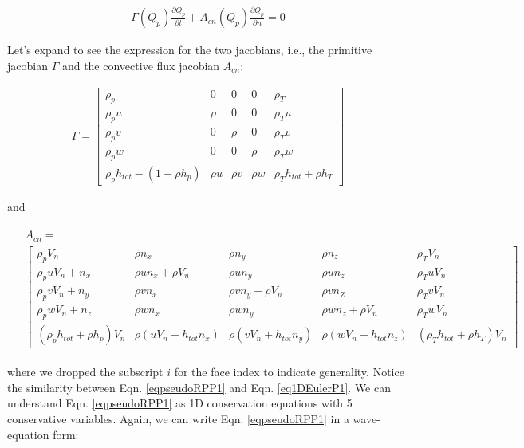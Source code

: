 \documentclass[12pt, letterpaper]{report}
\begin{document}
\begin{align}\label{eqpseudoRPP1}
   \Gamma(Q_p) \frac{\partial Q_p}{\partial t} + A_{cn}(Q_p)\frac{\partial Q_p}{\partial n} = 0
\end{align}

Let's expand to see the expression for the two jacobians, i.e., the primitive jacobian $\Gamma$ and
the convective flux jacobian $A_{cn}$:

\begin{align}\label{eqGamma3D}
   \Gamma = 
   \begin{bmatrix}
      \rho_p & 0 & 0 & 0 & \rho_T \\
      \rho_p u & \rho & 0 & 0 & \rho_T u \\ 
      \rho_p v & 0 & \rho & 0 & \rho_T v \\
      \rho_p w & 0 & 0 & \rho & \rho_T w \\
      \rho_p h_{tot} - (1 - \rho h_p) & \rho u & \rho v & \rho w & \rho_T h_{tot} + \rho h_T
   \end{bmatrix}
\end{align}

and \paraspace

\begin{align}\label{eqAcn}
   \begin{split}
      &A_{cn} = \\
      &\begin{bmatrix}
         \rho_p V_n & \rho n_x & \rho n_y & \rho n_z & \rho_T V_n \\
         \rho_p u V_n + n_x & \rho u n_x + \rho V_n & \rho u n_y & \rho u n_z & \rho_T u V_n \\
         \rho_p v V_n + n_y & \rho v n_x & \rho v n_y + \rho V_n & \rho v n_Z & \rho_T v V_n \\
         \rho_p w V_n + n_z & \rho w n_x & \rho w n_y & \rho w n_z + \rho V_n & \rho_T w V_n \\
         (\rho_p h_{tot} + \rho h_p) V_n & \rho(u V_n + h_{tot}n_x) & \rho(v V_n + h_{tot}n_y) & \rho(w
         V_n + h_{tot}n_z) & (\rho_T h_{tot} + \rho h_T)V_n
      \end{bmatrix}
   \end{split}
\end{align}

where we dropped the subscript $i$ for the face index to indicate generality. Notice the similarity
between Eqn. \ref{eqpseudoRPP1} and Eqn. \ref{eq1DEulerP1}. We can understand Eqn.
\ref{eqpseudoRPP1} as 1D conservation equations with 5 conservative variables. Again, we can write
Eqn. \ref{eqpseudoRPP1} in a wave-equation form:
\end{document}
